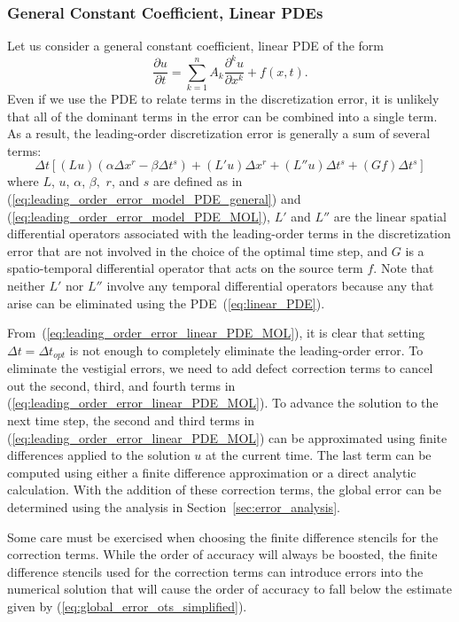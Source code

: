 \documentclass[fleqn,12pt,twoside]{article}
\newcommand{\beq}{\begin{equation}}
\newcommand{\eeq}{\end{equation}}
\def\dt{\Delta t}
\def\dx{\Delta x}
\def\dto{\dt_{opt}}
\begin{document}
\subsubsection*{\label{sec:ots_linear_pde} 
            General Constant Coefficient, Linear PDEs} 
Let us consider a general constant coefficient, linear PDE of the form
\beq
  \frac{\partial u}{\partial t} = 
  \sum_{k=1}^n A_k \frac{\partial^k u}{\partial x^k} + f(x,t)
  \label{eq:linear_PDE}.
\eeq
Even if we use the PDE to relate terms in the discretization error, it is
unlikely that all of the dominant terms in the error can be combined into 
a single term.   As a result, the leading-order discretization error is
generally a sum of several terms:
\beq
  \dt\left[ (L u) (\alpha \dx^r - \beta \dt^s) 
  + (L' u) \dx^r 
  + (L'' u) \dt^s 
  + (G f) \dt^s \right]
  \label{eq:leading_order_error_linear_PDE_MOL}
\eeq
where $L$, $u$, $\alpha$, $\beta,$ $r$, and $s$ are defined as in
(\ref{eq:leading_order_error_model_PDE_general}) and
(\ref{eq:leading_order_error_model_PDE_MOL}), 
$L'$ and $L''$ are the linear spatial differential operators associated 
with the leading-order terms in the discretization error that are not involved 
in the choice of the optimal time step, and $G$ is a spatio-temporal 
differential operator that acts on the source term $f$.  
Note that neither $L'$ nor $L''$ involve any temporal differential 
operators because any that arise can be eliminated using the 
PDE~(\ref{eq:linear_PDE}).  

From~(\ref{eq:leading_order_error_linear_PDE_MOL}), it is clear that setting 
$\dt = \dto$ is not enough to completely eliminate the 
leading-order error.  To eliminate the vestigial errors, we need to add 
defect correction terms to cancel out the second, third, and fourth terms in 
(\ref{eq:leading_order_error_linear_PDE_MOL}).  To advance the solution to
the next time step, the second and third terms in 
(\ref{eq:leading_order_error_linear_PDE_MOL}) can be approximated using finite
differences applied to the solution $u$ at the current time.
The last term can be computed using either a finite difference approximation 
or a direct analytic calculation.  With the addition of these correction 
terms, the global error can be determined using the analysis in 
Section~\ref{sec:error_analysis}.

Some care must be exercised when choosing the finite difference 
stencils for the correction terms.  While the order of accuracy will always
be boosted, the finite difference stencils used for the correction terms
can introduce errors into the numerical solution that will cause the order
of accuracy to fall below the estimate given by 
(\ref{eq:global_error_ots_simplified}).
\end{document}
